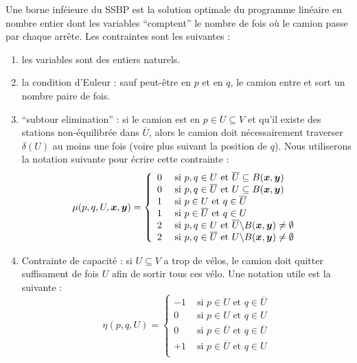 \documentclass[twoside,11pt,openany,a4paper]{rapport}
\begin{document}
Une borne inféieure du SSBP est la solution optimale du programme linéaire en nombre entier dont les variables ``comptent'' le nombre de fois où le camion passe par chaque arrête. Les contraintes sont les suivantes :
\begin{enumerate}[label=(\roman*)]
\item les variables sont des entiers naturels.
\item la condition d'Euleur : sauf peut-être en $p$ et en $q$, le camion entre et sort un nombre paire de fois.
\item ``subtour elimination'' : si le camion est en $p \in U \subseteq V $ et qu'il existe des stations non-équilibrée dans $\overline{U}$, alors le camion doit nécessairement traverser $\delta(U)$ au moins une fois (voire plus suivant la position de $q$). Nous utiliserons la notation suivante pour écrire cette contrainte :
\[
\mu(p,q,U,\boldsymbol{x},\boldsymbol{y}) = \left\{
\begin{array}{ll}
  0 &\mbox{ si } p,q \in U            \mbox{ et } \overline{U} \subseteq B(\boldsymbol{x},\boldsymbol{y})\\
  0 &\mbox{ si } p,q \in \overline{U} \mbox{ et } U \subseteq B(\boldsymbol{x},\boldsymbol{y})\\
  1 &\mbox{ si } p \in U              \mbox{ et } q \in \overline{U}\\
  1 &\mbox{ si } p \in \overline{U}   \mbox{ et } q \in U\\
  2 &\mbox{ si } p,q \in U            \mbox{ et } \overline{U} \backslash B(\boldsymbol{x},\boldsymbol{y}) \ne \emptyset\\
  2 &\mbox{ si } p,q \in \overline{U} \mbox{ et } U \backslash B(\boldsymbol{x},\boldsymbol{y}) \ne \emptyset
\end{array}
\right.
\]
\item Contrainte de capacité : si $U \subseteq V$ a trop de vélos, le camion doit quitter suffisament de fois $U$ afin de sortir tous ces vélo. Une notation utile est la suivante :
\[
\eta(p,q,U) = \left\{
\begin{array}{ll}
  -1 &\mbox{ si } p \in U            \mbox{ et } q \in \overline{U}\\
  0  &\mbox{ si } p \in U            \mbox{ et } q \in U\\
  0  &\mbox{ si } p \in \overline{U} \mbox{ et } q \in \overline{U}\\
  +1 &\mbox{ si } p \in \overline{U} \mbox{ et } q \in U\\
\end{array}
\right.
\]
\end{enumerate}
\end{document}
